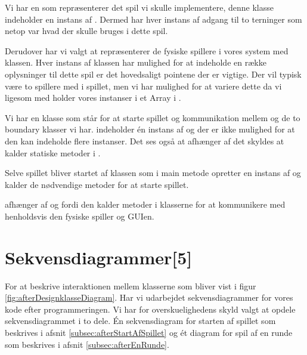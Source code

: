 Vi har en  som repræsenterer det spil vi skulle implementere, denne klasse indeholder en instans af . Dermed har hver instans af  adgang til to terninger som netop var hvad der skulle bruges i dette spil.

Derudover har vi valgt at repræsenterer de fysiske spillere i vores system med  klassen. Hver instans af klassen har mulighed for at indeholde en række oplysninger til dette spil er det hovedsaligt pointene der er vigtige. Der vil typisk være to spillere med i spillet, men vi har mulighed for at variere dette da vi ligesom med  holder vores  instanser i et Array i .

Vi har en  klasse som står for at starte spillet og kommunikation mellem  og de to boundary klasser vi har.  indeholder én instans af  og der er ikke mulighed for at den kan indeholde flere instanser. Det ses også at  afhænger af  det skyldes at  kalder statiske metoder i .

Selve spillet bliver startet af  klassen som i main metode opretter en instans af  og kalder de nødvendige metoder for at starte spillet.

 afhænger af  og  fordi den kalder metoder i klasserne for at kommunikere med henholdsvis den fysiske spiller og GUIen.

\section{Sekvensdiagrammer[5]}\label{sec:aftersekvensDiagram}
For at beskrive interaktionen mellem klasserne som bliver vist i figur \vref{fig:afterDesignklasseDiagram}. Har vi udarbejdet sekvensdiagrammer for vores kode efter programmeringen. Vi har for overskuelighedens skyld valgt at opdele sekvensdiagrammet i to dele. Én sekvensdiagram for starten af spillet som beskrives i afsnit \vref{subsec:afterStartAfSpillet} og ét diagram for spil af en runde som beskrives i afsnit \vref{subsec:afterEnRunde}.

